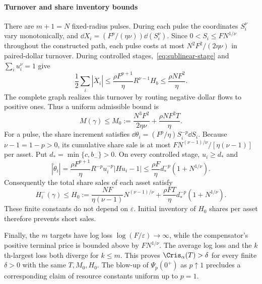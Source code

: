 \documentclass[review,hidelinks,onefignum,onetabnum]{siamonline250211}
\begin{document}
\paragraph{Turnover and share inventory bounds}
There are $m+1=N$ fixed-radius pulses.
During each pulse the coordinates $S_i^\nu$
vary monotonically, and
$\dd X_i=(F^p/(\eta\nu))\dd(S_i^\nu)$.
Since $0<S_i\le FN^{1/\nu}$ throughout
the constructed path, each pulse costs at most
$N^2F^2/(2\eta\nu)$ in paired-dollar turnover.
During controlled stages,~\eqref{eq:sublinear-stage}
and $\sum_i u_i^\nu=1$ give
\[
\frac12\sum_i|\dot X_i|
\le\frac{\rho F^{p+1}}{\eta}R^{\nu-1}H_b
\le\frac{\rho NF^2}{\eta}.
\]
The complete graph realizes this turnover by
routing negative dollar flows to positive ones.
Thus a uniform admissible bound is
\[
M(\gamma)\le M_0:=
\frac{N^3F^2}{2\eta\nu}
+\frac{\rho NF^2T}{\eta}.
\]
For a pulse, the share increment satisfies
$\dd\theta_i=(F^p/\eta)S_i^{-p}\dd S_i$.
Because $\nu-1=1-p>0$, its cumulative share
sale is at most
$FN^{(\nu-1)/\nu}/[\eta(\nu-1)]$ per asset.
Put $d_*=\min\{c,b_-\}>0$.
On every controlled stage, $u_i\ge d_*$ and
\[
|\dot\theta_i|=
\frac{\rho F^{p+1}}{\eta}
R^{-p}u_i^{-p}|Hu_i-1|
\le\frac{\rho F}{\eta}
d_*^{-p}(1+N^{1/\nu}).
\]
Consequently the total share sales of each
asset satisfy
\begin{equation}\label{eq:sublinear-inventory}
H_i^-(\gamma)\le H_0:=
\frac{NF}{\eta(\nu-1)}N^{(\nu-1)/\nu}
+\frac{\rho FT}{\eta}
d_*^{-p}(1+N^{1/\nu}).
\end{equation}
These finite constants do not depend on
$\varepsilon$. Initial inventory of $H_0$
shares per asset therefore prevents short sales.

Finally, the $m$ targets have log loss
$\log(F/\varepsilon)\to\infty$, while the
compensator's positive terminal price is bounded
above by $FN^{1/\nu}$. The average log loss
and the $k$th-largest loss both diverge for
$k\le m$. This proves
$\Cris_\alpha(T)>\delta$ for every finite
$\delta>0$ with the same $T,M_0,H_0$.
The blow-up of $\Psi_p(0^+)$ as $p\uparrow1$
precludes a corresponding claim of resource
constants uniform up to $p=1$.





\enlargethispage{2\baselineskip}

\end{document}

